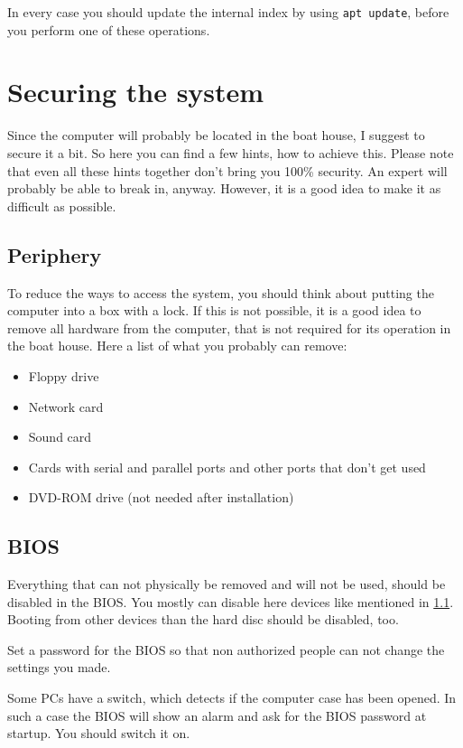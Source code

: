 \documentclass[a4paper,12pt,twoside]{article}
\begin{document}
In every case you should update the internal index by using
\texttt{apt update}, before you perform one
of these operations.


\section{Securing the system}
\label{sct:system_secure}
Since the computer will probably be
located in the boat house, I suggest to secure it a bit. So here you
can find a few hints, how to achieve this. Please note that even all
these hints together don't bring you 100\% security.
An expert will probably be able to break in, anyway. However, it is a
good idea to make it as difficult as possible.


\subsection{Periphery}
\label{sct:periphery}
To reduce the ways to access the system, you should think about putting
the computer into a box with a lock. If this is not possible, it is a 
good idea to remove all hardware from the computer, that is not
required for its operation in the boat house. Here a list of what you
probably can remove:

\begin{itemize}
    \item Floppy drive
    \item Network card
    \item Sound card
    \item Cards with serial and parallel ports and other ports that
        don't get used
    \item DVD-ROM drive (not needed after installation)
\end{itemize}


\subsection{BIOS}
\label{sct:bios}
Everything that can not physically be removed and will not be used,
should be disabled in the BIOS. You mostly can disable here devices
like mentioned in \ref{sct:periphery}. Booting from other devices than 
the hard disc should be disabled, too.

Set a password for the BIOS so that non authorized people can not change
the settings you made.

Some PCs have a switch, which detects if the computer case has been
opened. In such a case the BIOS will show an alarm and ask for the BIOS
password at startup. You should switch it on.
\end{document}
